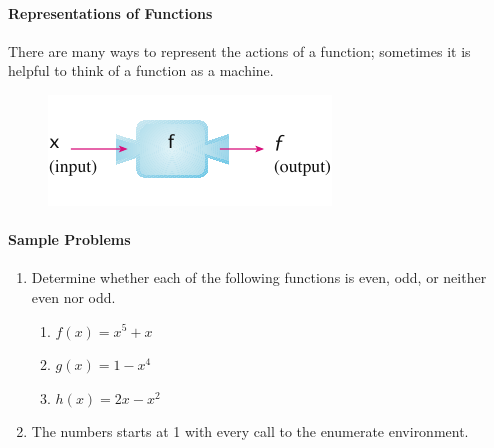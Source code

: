 \documentclass[11pt]{article}
\theoremstyle{plain}
\theoremstyle{definition}
\begin{document}
\paragraph{Representations of Functions} 
	There are many ways to represent the actions of a function; sometimes it is helpful to think of a function as a machine.
	
	\begin{figure}[h]
		\includegraphics{images/11-fig2}	
	\end{figure}

\paragraph{Sample Problems}
\begin{enumerate}
  \item Determine whether each of the following functions is even, odd, or neither even nor odd.
  \begin{enumerate}
     \item $f(x)=x^5+x$
     \item $g(x)=1-x^4$
     \item $h(x)=2x-x^2$
   \end{enumerate}
  \item The numbers starts at 1 with every call to the enumerate environment.
\end{enumerate}
\end{document}
